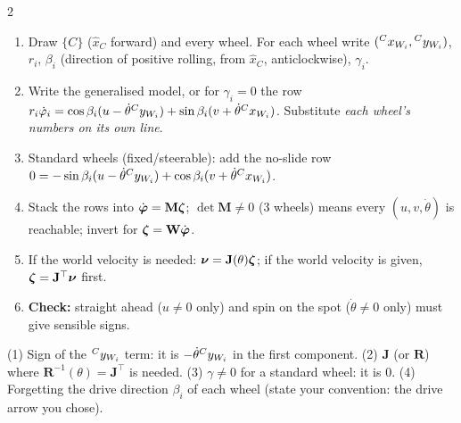 \begin{multicols}{2}
\begin{fbx}
\end{fbx}
\begin{recipe}
\begin{enumerate}
\item Draw $\{C\}$ ($\hat x_C$ forward) and every wheel. For each wheel write $({}^{C}x_{W_{i}},{}^{C}y_{W_{i}})$, $r_i$, $\beta_i$ (direction of positive rolling, from $\hat x_C$, anticlockwise), $\gamma_i$.
\item Write the generalised model, or for $\gamma_i=0$ the row $r_i\dot\varphi_i=\cos\beta_i(u-\dot\theta{}^{C}y_{W_{i}})+\sin\beta_i(v+\dot\theta{}^{C}x_{W_{i}})$. Substitute \emph{each wheel's numbers on its own line}.
\item Standard wheels (fixed/steerable): add the no-slide row $0=-\sin\beta_i(u-\dot\theta{}^{C}y_{W_{i}})+\cos\beta_i(v+\dot\theta{}^{C}x_{W_{i}})$.
\item Stack the rows into $\dot{\boldsymbol\varphi}=\mathbf M\boldsymbol\zeta$; $\det\mathbf M\neq0$ (3 wheels) means every $(u,v,\dot\theta)$ is reachable; invert for $\boldsymbol\zeta=\mathbf W\dot{\boldsymbol\varphi}$.
\item If the world velocity is needed: $\boldsymbol\nu=\mathbf J(\theta)\boldsymbol\zeta$; if the world velocity is given, $\boldsymbol\zeta=\mathbf J^\top\boldsymbol\nu$ first.
\item \textbf{Check:} straight ahead ($u\neq0$ only) and spin on the spot ($\dot\theta\neq0$ only) must give sensible signs.
\end{enumerate}
\end{recipe}
\begin{trap}
(1) Sign of the ${}^{C}y_{W_{i}}$ term: it is $-\dot\theta{}^{C}y_{W_{i}}$ in the first component. (2) $\mathbf J$ (or $\mathbf R$) where $\mathbf R^{-1}(\theta)=\mathbf J^\top$ is needed. (3) $\gamma\neq0$ for a standard wheel: it is $0$. (4) Forgetting the drive direction $\beta_i$ of each wheel (state your convention: the drive arrow you chose).
\end{trap}


\end{multicols}
